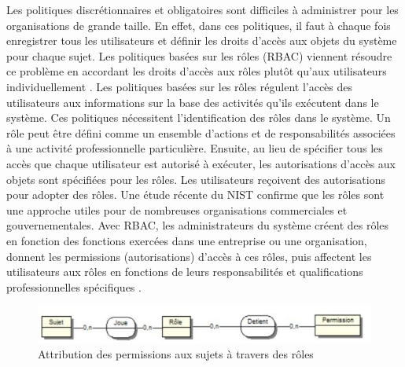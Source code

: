 Les politiques discrétionnaires et obligatoires sont difficiles à administrer pour les organisations de grande taille. En effet, dans ces politiques, il faut à chaque fois enregistrer tous les utilisateurs et définir les droits d'accès aux objets du système pour chaque sujet. Les politiques basées sur les rôles  (RBAC) viennent résoudre ce problème en accordant les droits d'accès aux rôles plutôt qu'aux utilisateurs individuellement \cite{sandhu96}. Les politiques basées sur les rôles régulent l'accès des utilisateurs aux informations sur la base des activités qu'ils exécutent dans le système. Ces politiques nécessitent l'identification des rôles dans le système. Un rôle peut être défini comme un ensemble d'actions et de responsabilités associées à une activité professionnelle particulière. Ensuite, au lieu de spécifier tous les accès que chaque utilisateur est autorisé à exécuter, les autorisations d'accès aux objets sont spécifiées pour les rôles. Les utilisateurs reçoivent des autorisations pour adopter des rôles. Une étude récente du NIST \cite{ferraiolo01} confirme que les rôles sont une approche utiles pour de nombreuses organisations commerciales et gouvernementales. Avec RBAC, les administrateurs du système créent des rôles en fonction des fonctions exercées dans une entreprise ou une organisation, donnent les permissions (autorisations) d'accès à ces rôles, puis affectent les utilisateurs aux rôles en fonctions de leurs responsabilités et qualifications professionnelles spécifiques \cite{theseBenoit}.\\ %

\begin{figure}[h!]
    \centering
		\includegraphics[scale=0.7]{chap2/images/RBACstandard.png}
    \caption{Attribution des permissions aux sujets à travers des rôles \cite{theseBenoit}}
	 \label{figARbac}
\end{figure}

\label{sectionComposantRBAC}

